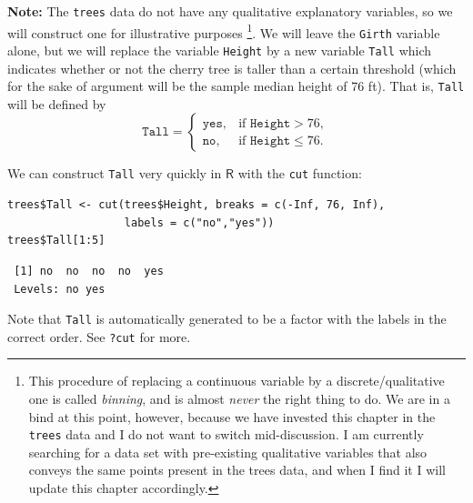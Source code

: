 \documentclass[captions=tableheading]{scrbook}
\begin{document}
\textbf{Note:}
The \texttt{trees} data do not have any qualitative explanatory variables, so we will construct one for illustrative purposes
\footnote{This procedure of replacing a continuous variable by a discrete/qualitative one is called \emph{binning}, and is almost \emph{never} the right thing to do. We are in a bind at this point, however, because we have invested this chapter in the \texttt{trees} data and I do not want to switch mid-discussion. I am currently searching for a data set with pre-existing qualitative variables that also conveys the same points present in the trees data, and when I find it I will update this chapter accordingly.}.
We will leave the \texttt{Girth} variable alone, but we will replace the variable \texttt{Height} by a new variable \texttt{Tall} which indicates whether or not the cherry tree is taller than a certain threshold (which for the sake of argument will be the sample median height of 76 ft). That is, \texttt{Tall} will be defined by
\begin{equation}
\mathtt{Tall}=
\begin{cases}
\mathtt{yes}, & \mbox{if }\mathtt{Height}>76,\\
\mathtt{no}, & \mbox{if }\mathtt{Height}\leq76.
\end{cases}
\end{equation}

We can construct \texttt{Tall} very quickly in \(\mathsf{R}\) with the \texttt{cut} function:


\lstset{language=R}
\begin{lstlisting}
trees$Tall <- cut(trees$Height, breaks = c(-Inf, 76, Inf), 
                  labels = c("no","yes"))
trees$Tall[1:5]
\end{lstlisting}

\begin{verbatim}
 [1] no  no  no  no  yes
 Levels: no yes
\end{verbatim}

Note that \texttt{Tall} is automatically generated to be a factor with the labels in the correct order. See \texttt{?cut} for more. 
\end{document}
